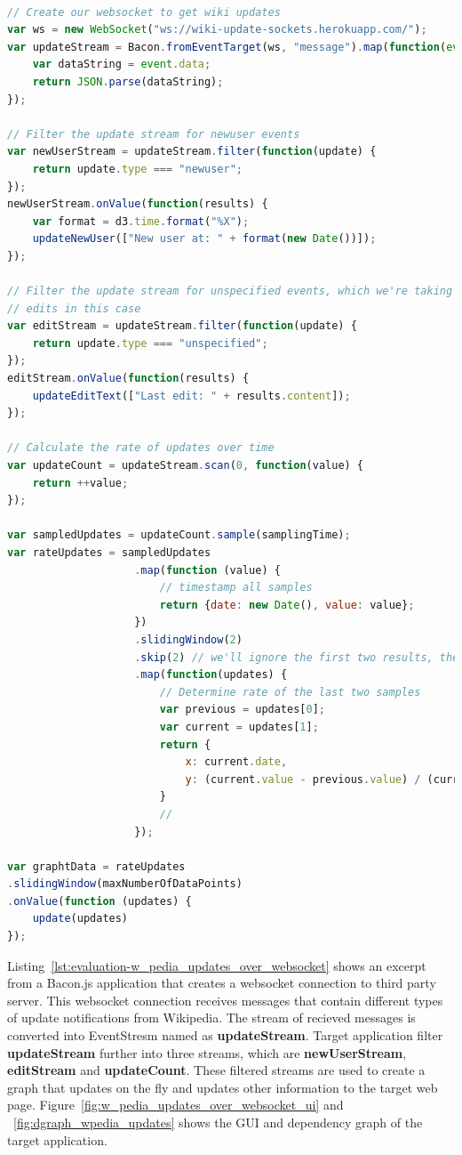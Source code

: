 \begin{lstlisting}[language=JavaScript, caption=Bacon.js - Live Wikipedia Updates Over Websockets, label={lst:evaluation-w_pedia_updates_over_websocket}]

// Create our websocket to get wiki updates
var ws = new WebSocket("ws://wiki-update-sockets.herokuapp.com/");
var updateStream = Bacon.fromEventTarget(ws, "message").map(function(event) {
	var dataString = event.data;
	return JSON.parse(dataString);
});

// Filter the update stream for newuser events
var newUserStream = updateStream.filter(function(update) {
	return update.type === "newuser";
});
newUserStream.onValue(function(results) {
	var format = d3.time.format("%X");
	updateNewUser(["New user at: " + format(new Date())]);
});

// Filter the update stream for unspecified events, which we're taking to mean 
// edits in this case
var editStream = updateStream.filter(function(update) {
	return update.type === "unspecified";
});
editStream.onValue(function(results) {
	updateEditText(["Last edit: " + results.content]);
});

// Calculate the rate of updates over time
var updateCount = updateStream.scan(0, function(value) {
	return ++value;
});

var sampledUpdates = updateCount.sample(samplingTime);
var rateUpdates = sampledUpdates
					.map(function (value) {
						// timestamp all samples
						return {date: new Date(), value: value};
					})
					.slidingWindow(2)
					.skip(2) // we'll ignore the first two results, they don't contain enough samples to determine a rate
					.map(function(updates) {
						// Determine rate of the last two samples
						var previous = updates[0];
						var current = updates[1];
						return {
							x: current.date,
							y: (current.value - previous.value) / (current.date - previous.date) * 1000 // Delta is in ms, but we need s.
						}
						//
					});

var graphtData = rateUpdates
.slidingWindow(maxNumberOfDataPoints)
.onValue(function (updates) {
	update(updates)
});
\end{lstlisting}

Listing~\ref{lst:evaluation-w_pedia_updates_over_websocket} shows an excerpt from a Bacon.js application that creates a websocket connection to third party server. This websocket connection receives messages that contain different types of update notifications from Wikipedia. The stream of recieved messages is converted into EventStresm named as \textbf{updateStream}. Target application filter \textbf{updateStream} further into three streams, which are \textbf{newUserStream}, \textbf{editStream} and \textbf{updateCount}. These filtered streams are used to create a graph that updates on the fly and updates other information to the target web page. Figure~\ref{fig:w_pedia_updates_over_websocket_ui} and ~\ref{fig:dgraph_wpedia_updates} shows the GUI and dependency graph of the target application.


